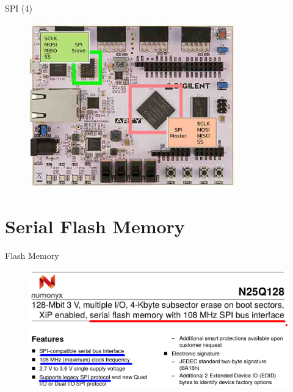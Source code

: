 \documentclass{beamer}
\begin{document}
    \begin{frame}{SPI (4)}
    	\begin{figure}[!tbh]
    		\centering
    		\includegraphics*[width=0.8\textwidth]{images/board}
    	\end{figure}   
    \end{frame}

   \section{Serial Flash Memory}

    \begin{frame}{Flash Memory}
    	\begin{figure}[!tbh]
    		\centering
    		\includegraphics*[width=1\textwidth]{images/flash}
    	\end{figure}       	
    \end{frame}
\end{document}
